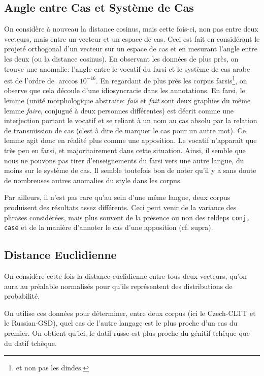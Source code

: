 \documentclass{cours}
\begin{document}
\subsection{Angle entre Cas et Système de Cas}
On considère à nouveau la distance cosinus, mais cette fois-ci, non pas entre deux vecteurs, mais entre un vecteur et un espace de cas.
Ceci est fait en considérant le projeté orthogonal d'un vecteur sur un espace de cas et en mesurant l'angle entre les deux (ou la distance cosinus).
En observant les données de plus près, on trouve une anomalie: l'angle entre le vocatif du farsi et le système de cas arabe est de l'ordre de $\arccos{10^{-16}}$.
En regardant de plus près les corpus farsis\footnote{et non pas les dindes.}, on observe que cela découle d'une idiosyncracie dans les annotations.
En farsi, le lemme (unité morphologique abstraite: \textsl{fais} et \textsl{fait} sont deux graphies du même lemme \textsl{faire}, conjugué à deux personnes différentes)
est décrit comme une interjection portant le vocatif et se reliant à un nom au cas absolu par la relation de transmission de cas (c'est à dire de marquer le cas pour un autre mot).
Ce lemme agit donc en réalité plus comme une apposition.
Le vocatif n'apparaît que très peu en farsi, et majoritairement dans cette situation.
Ainsi, il semble que nous ne pouvons pas tirer d'enseignements du farsi vers une autre langue, du moins sur le système de cas.
Il semble toutefois bon de noter qu'il y a sans doute de nombreuses autres anomalies du style dans les corpus.

Par ailleurs, il n'est pas rare qu'au sein d'une même langue, deux corpus produisent des résultats assez différents. Ceci peut venir de la variance des phrases considérées, mais plus souvent de la présence ou non des reldeps \texttt{conj, case} et de la manière d'annoter le cas d'une apposition (cf. supra).

\subsection{Distance Euclidienne}
On considère cette fois la distance euclidienne entre tous deux vecteurs, qu'on aura au préalable normalisés pour qu'ils représentent des distributions de probabilité.



On utilise ces données pour déterminer, entre deux corpus (ici le Czech-CLTT et le Russian-GSD), quel cas de l'autre langage est le plus proche d'un cas du premier.
On obtient qu'ici, le datif russe est plus proche du génitif tchèque que du datif tchèque.
\end{document}
